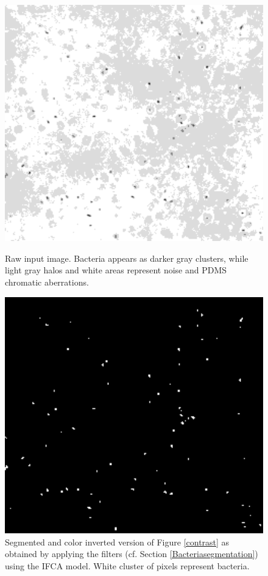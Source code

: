 \begin{figure}
    \begin{minipage}{0.48\textwidth}
        \centering
        \includegraphics[width=1.0\textwidth]{./images/bacteria/bacteriasmall}
        \caption{Raw input image. Bacteria appears as darker gray clusters, while light gray halos and white areas represent noise and PDMS chromatic aberrations.}\label{contrast}
    \end{minipage}
    \begin{minipage}{0.48\textwidth}
        \centering
        \includegraphics[width=1.0\textwidth]{./images/bacteria/bacteriasmall_threshold}
        \caption{Segmented and color inverted version of Figure \ref{contrast} as obtained by applying the filters (cf. Section \ref{Bacteriasegmentation}) using the IFCA model. White cluster of pixels represent bacteria.}\label{BBB}
    \end{minipage}
   
\end{figure}
